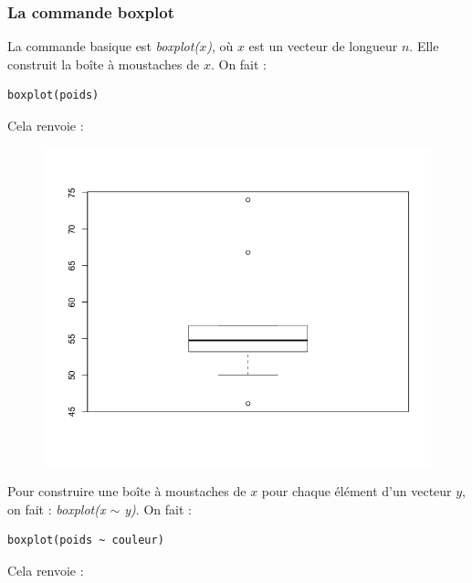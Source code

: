\subsubsection{La commande boxplot}
La commande basique est \textit{boxplot($x$)}, où $x$ est un vecteur de longueur $n$. Elle construit la boîte à moustaches de $x$.\newline
On fait :
\begin{lstlisting}[language=html]
boxplot(poids)
\end{lstlisting}
Cela renvoie :
\begin{figure}[H]\begin{center}\includegraphics[scale=0.4]{ilu/gra50.png}\end{center}\end{figure}
Pour construire une boîte à moustaches de $x$ pour chaque élément d'un vecteur $y$, on fait : \textit{boxplot(x $\sim$ y)}.\newline
On fait :
\begin{lstlisting}[language=html]
boxplot(poids ~ couleur)
\end{lstlisting}
Cela renvoie :
